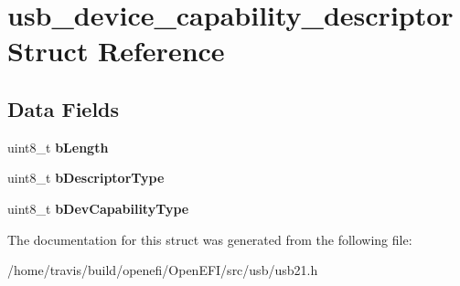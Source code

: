 \hypertarget{structusb__device__capability__descriptor}{}\section{usb\+\_\+device\+\_\+capability\+\_\+descriptor Struct Reference}
\label{structusb__device__capability__descriptor}
\subsection*{Data Fields}
\begin{DoxyCompactItemize}
\item 
uint8\+\_\+t {\bfseries b\+Length}\hypertarget{structusb__device__capability__descriptor_ac935ef2a3a2f8ca6c47b191d23d7134b}{}\label{structusb__device__capability__descriptor_ac935ef2a3a2f8ca6c47b191d23d7134b}

\item 
uint8\+\_\+t {\bfseries b\+Descriptor\+Type}\hypertarget{structusb__device__capability__descriptor_aa56ce3f80c141b7b6980d5b4aaec3123}{}\label{structusb__device__capability__descriptor_aa56ce3f80c141b7b6980d5b4aaec3123}

\item 
uint8\+\_\+t {\bfseries b\+Dev\+Capability\+Type}\hypertarget{structusb__device__capability__descriptor_a9a78b864547cec2add49b840094ff661}{}\label{structusb__device__capability__descriptor_a9a78b864547cec2add49b840094ff661}

\end{DoxyCompactItemize}


The documentation for this struct was generated from the following file\+:\begin{DoxyCompactItemize}
\item 
/home/travis/build/openefi/\+Open\+E\+F\+I/src/usb/usb21.\+h\end{DoxyCompactItemize}
